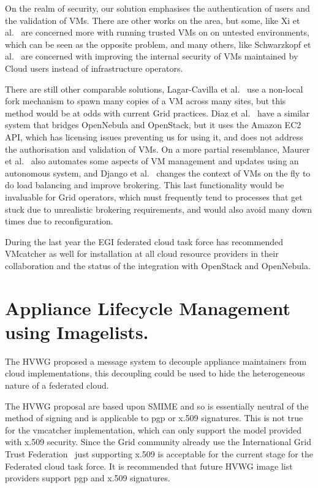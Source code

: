 \documentclass{llncs_Ibergrid2013}
\begin{document}
On the realm of security, our solution emphasises the authentication of users and the validation of VMs. There are other works on the area, but some, like Xi et al.~\cite{Xi2012} are concerned more with running trusted VMs on on untested environments, which can be seen as the opposite problem, and many others, like Schwarzkopf et al.~\cite{Schwarzkopf2012} are concerned with improving the internal security of VMs maintained by Cloud users instead of infrastructure operators.

There are still other comparable solutions, Lagar-Cavilla et al.~\cite{Lagar-Cavilla2009} use a non-local fork mechanism to spawn many copies of a VM across many sites, but this method would be at odds with current Grid practices. Diaz et al.~\cite{Diaz2012} have a similar system that bridges OpenNebula and OpenStack, but it uses the Amazon EC2 API, which has licensing issues preventing us for using it, and does not address the authorisation and validation of VMs. On a more partial resemblance, Maurer et al.~\cite{Maurer2013} also automates some aspects of VM management and updates using an autonomous system, and Django et al.~\cite{Django2013} changes the context of VMs on the fly to do load balancing and improve brokering. This last functionality would be invaluable for Grid operators, which must frequently tend to processes that get stuck due to unrealistic brokering requirements, and would also avoid many down times due to reconfiguration.


During the last year the EGI federated cloud task force has recommended VMcatcher as well for installation at all cloud resource providers in their collaboration and the status of the integration with OpenStack and OpenNebula.


\section{Appliance Lifecycle Management using Imagelists.}
\label{sect-appliancelifecycle}

The HVWG proposed a message system to decouple appliance maintainers from cloud implementations, this decoupling could be used to hide the heterogeneous nature of a federated cloud.

The HVWG proposal are based upon SMIME and so is essentially neutral of the method of signing and is applicable to pgp or x.509 signatures. This is not true for the vmcatcher implementation, which can only support the model provided with x.509 security. Since the Grid community already use the International Grid Trust Federation~\cite{igtf} just supporting x.509 is acceptable for the current stage for the Federated cloud task force. It is recommended that future HVWG image list providers support pgp and x.509 signatures.
\end{document}
